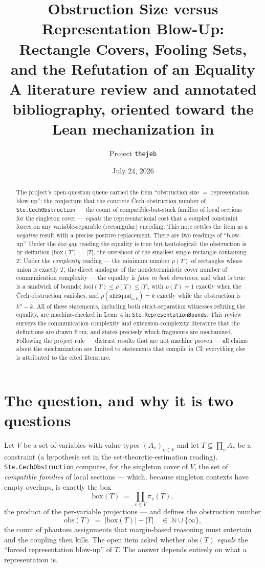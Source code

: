 \documentclass[11pt]{article}
\title{Obstruction Size versus Representation Blow-Up:\\
Rectangle Covers, Fooling Sets, and the Refutation of an Equality\\
\large A literature review and annotated bibliography, oriented toward
the Lean mechanization in \ste{Ste.RepresentationBounds}}
\author{Project \texttt{thejeb}}
\date{July 24, 2026}
\newcommand{\ste}[1]{\texttt{#1}}
\newcommand{\cech}{\v{C}ech}
\begin{document}
\maketitle

\begin{abstract}
The project's open-question queue carried the item ``obstruction size
$=$ representation blow-up'': the conjecture that the concrete \cech{}
obstruction number of \ste{Ste.CechObstruction} --- the count of
compatible-but-stuck families of local sections for the singleton cover
--- \emph{equals} the representational cost that a coupled constraint
forces on any variable-separable (rectangular) encoding. This note
settles the item as a \emph{negative} result with a precise positive
replacement. There are two readings of ``blow-up''. Under the
\emph{box-gap} reading the equality is true but tautological: the
obstruction is by definition $|\mathrm{box}(T)|-|T|$, the overshoot of
the smallest single rectangle containing $T$. Under the
\emph{complexity} reading --- the minimum number $\rho(T)$ of
rectangles whose union is exactly $T$, the direct analogue of the
nondeterministic cover number of communication complexity --- the
equality is \emph{false in both directions}, and what is true is a
sandwich of bounds: $\mathrm{fool}(T)\le\rho(T)\le|T|$, with
$\rho(T)=1$ exactly when the \cech{} obstruction vanishes, and
$\rho(\mathrm{allEqual}_{n,k})=k$ exactly while the obstruction is
$k^n-k$. All of these statements, including both strict-separation
witnesses refuting the equality, are machine-checked in Lean~4 in
\ste{Ste.RepresentationBounds}. This review surveys the communication
complexity and extension-complexity literature that the definitions are
drawn from, and states precisely which fragments are mechanized.
Following the project rule --- distrust results that are not machine
proven --- all claims about the mechanization are limited to statements
that compile in CI; everything else is attributed to the cited
literature.
\end{abstract}

\section{The question, and why it is two questions}

Let $V$ be a set of variables with value types $(A_v)_{v\in V}$ and let
$T\subseteq\prod_{v}A_v$ be a constraint (a hypothesis set in the
set-theoretic-estimation reading). \ste{Ste.CechObstruction} computes,
for the singleton cover of $V$, the set of \emph{compatible families}
of local sections --- which, because singleton contexts have empty
overlaps, is exactly the box
\[
\mathrm{box}(T)\;=\;\prod_{v\in V}\pi_v(T),
\]
the product of the per-variable projections --- and defines the
obstruction number
\[
\mathrm{obs}(T)\;=\;\bigl|\mathrm{box}(T)\bigr|-\bigl|T\bigr|
\quad\in\;\mathbb{N}\cup\{\infty\},
\]
the count of phantom assignments that margin-based reasoning must
entertain and the coupling then kills. The open item asked whether
$\mathrm{obs}(T)$ \emph{equals} the ``forced representation blow-up''
of $T$. The answer depends entirely on what a representation is.
\end{document}
